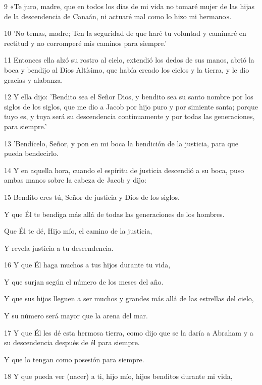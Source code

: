 \par 9 «Te juro, madre, que en todos los días de mi vida no tomaré mujer de las hijas de la descendencia de Canaán, ni actuaré mal como lo hizo mi hermano».
\par 10 'No temas, madre; Ten la seguridad de que haré tu voluntad y caminaré en rectitud y no corromperé mis caminos para siempre.'
\par 11 Entonces ella alzó su rostro al cielo, extendió los dedos de sus manos, abrió la boca y bendijo al Dios Altísimo, que había creado los cielos y la tierra, y le dio gracias y alabanza.
\par 12 Y ella dijo: 'Bendito sea el Señor Dios, y bendito sea su santo nombre por los siglos de los siglos, que me dio a Jacob por hijo puro y por simiente santa; porque tuyo es, y tuya será su descendencia continuamente y por todas las generaciones, para siempre.'
\par 13 'Bendícelo, Señor, y pon en mi boca la bendición de la justicia, para que pueda bendecirlo.
\par 14 Y en aquella hora, cuando el espíritu de justicia descendió a su boca, puso ambas manos sobre la cabeza de Jacob y dijo:
\par    
\par 15 Bendito eres tú, Señor de justicia y Dios de los siglos.  
\par     Y que Él te bendiga más allá de todas las generaciones de los hombres.
\par    
\par     Que Él te dé, Hijo mío, el camino de la justicia,  
\par     Y revela justicia a tu descendencia.
\par    
\par 16 Y que Él haga muchos a tus hijos durante tu vida,  
\par     Y que surjan según el número de los meses del año.  
\par     Y que sus hijos lleguen a ser muchos y grandes más allá de las estrellas del cielo,  
\par     Y su número será mayor que la arena del mar.
\par    
\par 17 Y que Él les dé esta hermosa tierra, como dijo que se la daría a Abraham y a su descendencia después de él para siempre.  
\par     Y que lo tengan como posesión para siempre.
\par    
\par 18 Y que pueda ver (nacer) a ti, hijo mío, hijos benditos durante mi vida,  
